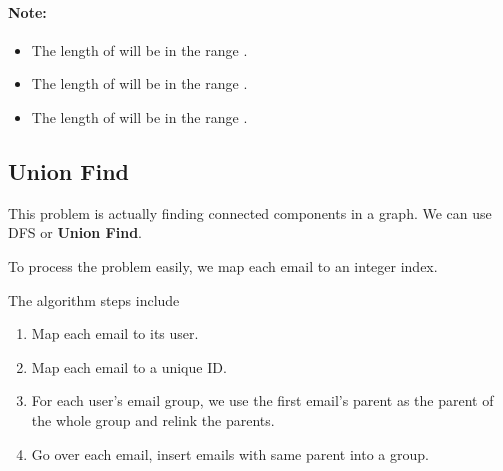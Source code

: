\paragraph{Note:}

\begin{itemize}
\item The length of  will be in the range \fcj{[1, 1000]}.
\item The length of  will be in the range \fcj{[1, 10]}.
\item The length of  will be in the range \fcj{[1, 30]}.
\end{itemize}

\subsection{Union Find}
This problem is actually finding connected components in a graph. We can use DFS or \textbf{Union Find}.

To process the problem easily, we map each email to an integer index. 

The algorithm steps include
\begin{enumerate}
\item Map each email to its user.
\item Map each email to a unique ID.
\item For each user's email group, we use the first email's parent as the parent of the whole group and relink the parents.
\item Go over each email, insert emails with same parent into a group.
\end{enumerate}

